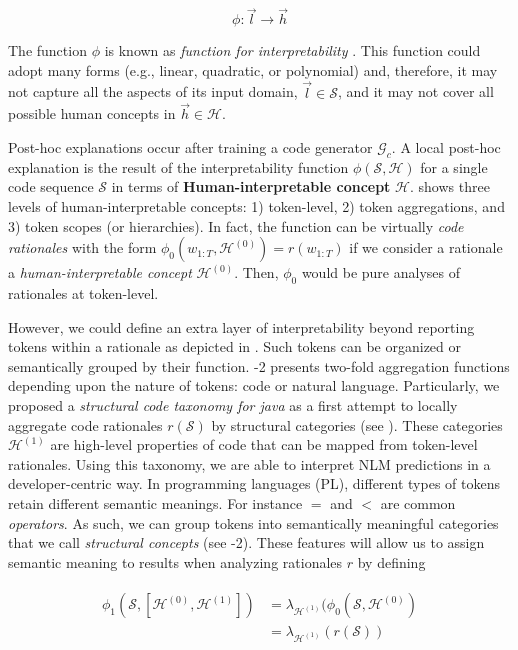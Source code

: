 \begin{equation}
\phi: \Vec{l} \to \Vec{h}
\label{eq:kim}
\end{equation}

The function $\phi$ is known as \textit{function for interpretability} \citep{Kim2018InterpretabilityTCAV}. This function could adopt many forms (e.g., linear, quadratic, or polynomial) and, therefore, it may not capture all the aspects of its input domain, $\Vec{l} \in \mathcal{S}$, and it may not cover all possible human concepts in $\Vec{h} \in \mathcal{H}$. 

Post-hoc explanations occur after training a code generator $\mathcal{G}_c$. A local post-hoc explanation is the result of the interpretability function $\phi(\mathcal{S},\mathcal{H})$ for a single code sequence $\mathcal{S}$ in terms of \textbf{Human-interpretable concept} $\mathcal{H}$.  shows three levels of human-interpretable concepts: 1) token-level, 2) token aggregations, and 3) token scopes (or hierarchies). In fact, the function  can be virtually \textit{code rationales} with the form $\phi_0(w_{1:T}, \mathcal{H}^{(0)}) = r(w_{1:T})$ if we consider a rationale a \textit{human-interpretable concept} $\mathcal{H}^{(0)}$. Then, $\phi_0$ would be pure analyses of rationales at token-level. 

However, we could define an extra layer of interpretability beyond reporting tokens within a rationale as depicted in . Such tokens can be organized or semantically grouped by their function. -2 presents two-fold aggregation functions depending upon the nature of tokens: code or natural language. Particularly, we proposed a \textit{structural code taxonomy for java} as a first attempt to locally aggregate code rationales $r(\mathcal{S})$ by structural categories (see ). These categories $\mathcal{H}^{(1)}$ are high-level properties of code that can be mapped from token-level rationales. Using this taxonomy, we are able to interpret NLM predictions in a developer-centric way. In programming languages (PL), different types of tokens retain different semantic meanings. For instance $=$ and $<$ are common \textit{operators}. As such, we can group tokens into semantically meaningful categories that we call \textit{structural concepts} (see -2). These features will allow us to assign semantic meaning to results when analyzing rationales $r$ by defining 

\begin{align}
\begin{split}
\phi_1(\mathcal{S}, [\mathcal{H}^{(0)},  \mathcal{H}^{(1)}])  & = \lambda_{\mathcal{H}^{(1)} } ( \phi_0(\mathcal{S}, \mathcal{H}^{(0)} ) \\
                                                            & = \lambda_{\mathcal{H}^{(1)} } ( r(\mathcal{S}) )
\end{split}
\label{eq:structuralagg}
\end{align}

